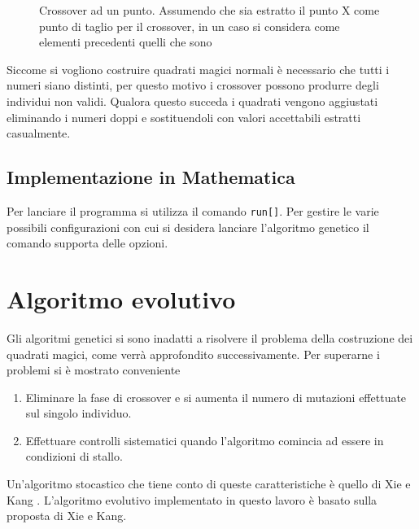 \documentclass[italian,twoside,twocolumn]{article}
\begin{document}
\begin{figure}[!htbp]
	\centering
	\caption{Crossover ad un punto. Assumendo che sia estratto il punto X come punto di taglio per il crossover, in un caso si considera come elementi precedenti quelli che sono}
\end{figure}

Siccome si vogliono costruire quadrati magici normali è necessario che tutti i numeri siano distinti, per questo motivo i crossover possono produrre degli individui non validi. Qualora questo succeda i quadrati vengono aggiustati eliminando i numeri doppi e sostituendoli con valori accettabili estratti casualmente.


\subsection{Implementazione in Mathematica}


Per lanciare il programma si utilizza il comando \texttt{run[]}. Per gestire le varie possibili configurazioni con cui si desidera lanciare l'algoritmo genetico il comando supporta delle opzioni.




\section{Algoritmo evolutivo}
Gli algoritmi genetici si sono inadatti a risolvere il problema della costruzione dei quadrati magici, come verrà approfondito successivamente. Per superarne i problemi si è mostrato conveniente
\begin{enumerate}
	\item Eliminare la fase di crossover e si aumenta il numero di mutazioni effettuate sul singolo individuo.
	\item Effettuare controlli sistematici quando l'algoritmo comincia ad essere in condizioni di stallo. 
\end{enumerate}
Un'algoritmo stocastico che tiene conto di queste caratteristiche è quello di Xie e Kang \cite{XieKang:2003}. L'algoritmo evolutivo implementato in questo lavoro è basato sulla proposta di Xie e Kang.
\end{document}
